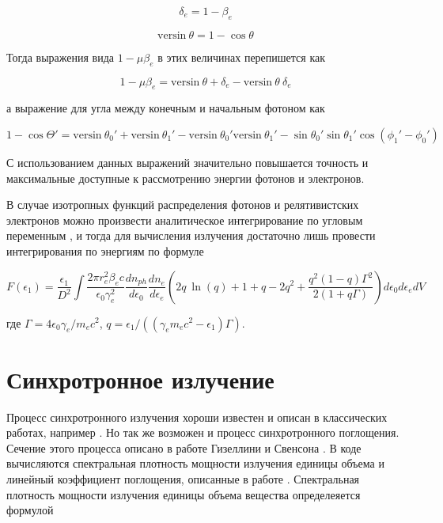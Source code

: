\begin{equation}
	\delta_e = 1 - \beta_e
\end{equation}

\begin{equation}
	\text{versin}~\theta = 1 - \cos \theta
\end{equation}

Тогда выражения вида $1 - \mu \beta_e$ в этих величинах перепишется как

\begin{equation}
	1 - \mu \beta_e =\text{versin}~\theta + \delta_e - \text{versin}~\theta~\delta_e
\end{equation}

а выражение для угла между конечным и начальным фотоном как

\begin{equation}
	1 - \cos \Theta' = \text{versin}~\theta_0' + \text{versin}~\theta_1' - \text{versin}~ \theta_0' \text{versin}~\theta_1' - \sin \theta_0'\sin \theta_1' \cos(\phi_1'-\phi_0')
\end{equation}

С использованием данных выражений значительно повышается точность и максимальные доступные к рассмотрению энергии фотонов и электронов.

В случае изотропных функций распределения фотонов и релятивистских электронов можно произвести аналитическое интегрирование по угловым переменным \cite{JonesCompton, BykovUvarov2000}, и тогда для вычисления излучения достаточно лишь провести интегрирования по энергиям по формуле

\begin{equation}
F(\epsilon_1)=\frac{\epsilon_1}{D^2}\int \frac{2 \pi r_e^2 \beta_e c}{\epsilon_0 \gamma_e^2} \frac{dn_{ph}}{d\epsilon_0}\frac{dn_e}{d\epsilon_e}(2 q~ \ln(q)+1+q-2q^2+\frac{q^2(1-q)\Gamma^2}{2(1+q\Gamma)})d\epsilon_0 d\epsilon_e dV
\end{equation}

где $\Gamma=4\epsilon_0\gamma_e/m_e c^2$, $q=\epsilon_1/((\gamma_e m_e c^2-\epsilon_1)\Gamma)$.

\section{Синхротронное излучение}
Процесс синхротронного излучения хороши известен и описан в классических работах, например \cite{Ginzburg1975}. Но так же возможен и процесс синхротронного поглощения. Сечение этого процесса описано в работе Гизеллини и Свенсона \cite{Ghisellini1991}. В коде вычисляются спектральная плотность мощности излучения единицы объема и линейный коэффициент поглощения, описанные в работе \cite{Ghisellini}. Спектральная плотность мощности излучения единицы объема вещества определеяется формулой

